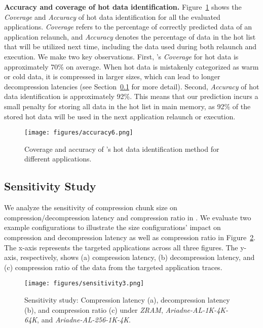 \noindent\textbf{Accuracy and coverage of hot data identification.} Figure~\ref{fig:accuracy} shows the \emph{Coverage} and \emph{Accuracy} of hot data identification for all the evaluated applications. \emph{Coverage} refers to the percentage of correctly predicted data of an application relaunch, and \emph{Accuracy} denotes the percentage of data in the hot list that will be utilized next time, including the data used during both relaunch and execution. 
We make two key observations. 
First, \proposal's \emph{Coverage} for hot data is approximately 70\% on average.
When hot data is mistakenly categorized as warm or cold data, it is compressed in larger sizes, which can lead to longer decompression latencies (see Section~\ref{sec:sensitivity} for more detail).
Second, \emph{Accuracy} of hot data identification is approximately 92\%. This means that our prediction incurs a small penalty for storing all data in the hot list in main memory, as 92\% of the stored hot data will be used in the next application relaunch or execution.




\begin{figure}[!h]
\centering
\texttt{[image: figures/accuracy6.png]}
\caption{Coverage and accuracy of \proposal's hot data identification method for different applications.}
\label{fig:accuracy}
\end{figure}

\subsection{Sensitivity Study}
\label{sec:sensitivity}

We analyze the sensitivity of compression chunk size on compression/decompression latency and compression ratio in \proposal. 
We evaluate two example configurations to illustrate the size configurations' impact on compression and decompression latency as well as compression ratio in Figure~\ref{fig:sensitivity}. The x-axis represents the targeted applications across all three figures. The y-axis, respectively, shows (a) compression latency,  (b) decompression latency, and (c) compression ratio of the data from the targeted application traces. 

\begin{figure}[!h]
\vspace{0.5em}
\centering
\texttt{[image: figures/sensitivity3.png]}
\caption{Sensitivity study: Compression latency (a), decompression latency (b), and compression ratio (c) under \emph{ZRAM}, \emph{Ariadne-AL-1K-4K-64K}, and \emph{Ariadne-AL-256-1K-4K}.}
\label{fig:sensitivity}
\end{figure}


